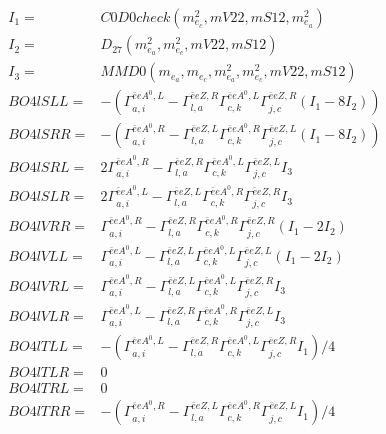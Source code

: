 \documentclass[A4,landscape]{article}
\begin{document}
\begin{align} 
I_1 = & C0D0check(m^2_{e_{{c}}}, mV22, mS12, m^2_{e_{{a}}}) \\ 
I_2 = & D_{27}(m^2_{e_{{a}}}, m^2_{e_{{c}}}, mV22, mS12) \\ 
I_3 = & MMD0(m_{e_{{a}}}, m_{e_{{c}}}, m^2_{e_{{a}}}, m^2_{e_{{c}}}, mV22, mS12) \\ 
  BO4lSLL= & -( \Gamma^{\bar{e}e A^0 ,L}_{a, i} - \Gamma^{\bar{e}e Z ,R} _{l, a} \Gamma^{\bar{e}e A^0 ,L}_{c, k} \Gamma^{\bar{e}e Z ,R}_{j, c} (I_1 - 8 I_2)) \\ 
  BO4lSRR= & -( \Gamma^{\bar{e}e A^0 ,R}_{a, i} - \Gamma^{\bar{e}e Z ,L} _{l, a} \Gamma^{\bar{e}e A^0 ,R}_{c, k} \Gamma^{\bar{e}e Z ,L}_{j, c} (I_1 - 8 I_2)) \\ 
  BO4lSRL= & 2  \Gamma^{\bar{e}e A^0 ,R}_{a, i} - \Gamma^{\bar{e}e Z ,R} _{l, a} \Gamma^{\bar{e}e A^0 ,L}_{c, k} \Gamma^{\bar{e}e Z ,L}_{j, c} I_3 \\ 
  BO4lSLR= & 2  \Gamma^{\bar{e}e A^0 ,L}_{a, i} - \Gamma^{\bar{e}e Z ,L} _{l, a} \Gamma^{\bar{e}e A^0 ,R}_{c, k} \Gamma^{\bar{e}e Z ,R}_{j, c} I_3 \\ 
  BO4lVRR= &  \Gamma^{\bar{e}e A^0 ,R}_{a, i} - \Gamma^{\bar{e}e Z ,R} _{l, a} \Gamma^{\bar{e}e A^0 ,R}_{c, k} \Gamma^{\bar{e}e Z ,R}_{j, c} (I_1 - 2 I_2) \\ 
  BO4lVLL= &  \Gamma^{\bar{e}e A^0 ,L}_{a, i} - \Gamma^{\bar{e}e Z ,L} _{l, a} \Gamma^{\bar{e}e A^0 ,L}_{c, k} \Gamma^{\bar{e}e Z ,L}_{j, c} (I_1 - 2 I_2) \\ 
  BO4lVRL= &  \Gamma^{\bar{e}e A^0 ,R}_{a, i} - \Gamma^{\bar{e}e Z ,L} _{l, a} \Gamma^{\bar{e}e A^0 ,L}_{c, k} \Gamma^{\bar{e}e Z ,R}_{j, c} I_3 \\ 
  BO4lVLR= &  \Gamma^{\bar{e}e A^0 ,L}_{a, i} - \Gamma^{\bar{e}e Z ,R} _{l, a} \Gamma^{\bar{e}e A^0 ,R}_{c, k} \Gamma^{\bar{e}e Z ,L}_{j, c} I_3 \\ 
  BO4lTLL= & -( \Gamma^{\bar{e}e A^0 ,L}_{a, i} - \Gamma^{\bar{e}e Z ,R} _{l, a} \Gamma^{\bar{e}e A^0 ,L}_{c, k} \Gamma^{\bar{e}e Z ,R}_{j, c} I_1)/4 \\ 
  BO4lTLR= & 0 \\ 
  BO4lTRL= & 0 \\ 
  BO4lTRR= & -( \Gamma^{\bar{e}e A^0 ,R}_{a, i} - \Gamma^{\bar{e}e Z ,L} _{l, a} \Gamma^{\bar{e}e A^0 ,R}_{c, k} \Gamma^{\bar{e}e Z ,L}_{j, c} I_1)/4 \\ 
\end{align} 
\end{document}
